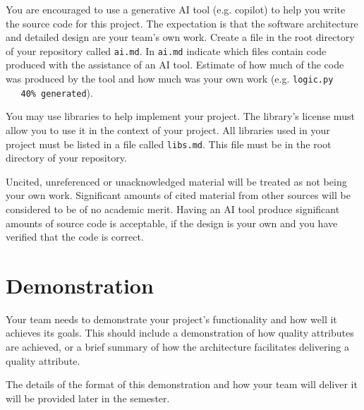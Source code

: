 \documentclass{csse4400}
\begin{document}
You are encouraged to use a generative AI tool (e.g. copilot) to help you write the source code for this project.
The expectation is that the software architecture and detailed design are your team's own work.
Create a file in the root directory of your repository called \texttt{ai.md}.
In \texttt{ai.md} indicate which files contain code produced with the assistance of an AI tool.
Estimate of how much of the code was produced by the tool and how much was your own work
(e.g. \texttt{logic.py ~~~40\% generated}).

You may use libraries to help implement your project.
The library's license must allow you to use it in the context of your project.
All libraries used in your project must be listed in a file called \texttt{libs.md}.
This file must be in the root directory of your repository.

Uncited, unreferenced or unacknowledged material will be treated as not being your own work.
Significant amounts of cited material from other sources will be considered to be of no academic merit.
Having an AI tool produce significant amounts of source code is acceptable,
if the design is your own and you have verified that the code is correct.


\section{Demonstration}
Your team needs to demonstrate your project's functionality and how well it achieves its goals.
This should include a demonstration of how quality attributes are achieved,
or a brief summary of how the architecture facilitates delivering a quality attribute.

The details of the format of this demonstration and how your team will deliver it will be provided later in the semester.

%
\end{document}
